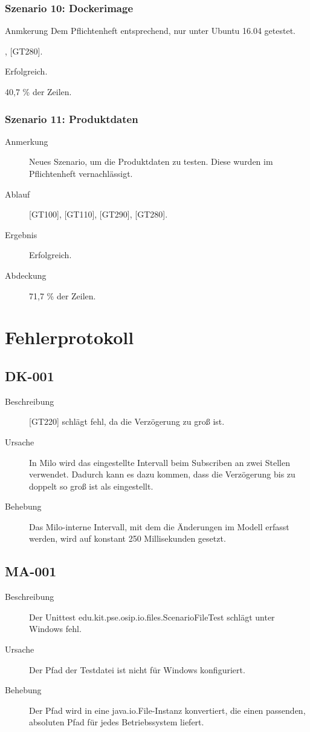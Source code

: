 \documentclass[parskip=full]{scrartcl}
\begin{document}
\subsubsection{Szenario 10: Dockerimage}
\begin{description}
	\item{Anmkerung} Dem Pflichtenheft entsprechend, nur unter Ubuntu 16.04 getestet.
	\item[Ablauf] [GT130], [GT280].
	\item[Ergebnis] Erfolgreich.
	\item[Abdeckung] 40,7 \% der Zeilen.
\end{description}

\subsubsection{Szenario 11: Produktdaten}
\begin{description}
	\item[Anmerkung] Neues Szenario, um die Produktdaten zu testen. Diese wurden im Pflichtenheft vernachlässigt.
	\item[Ablauf] [GT100], [GT110], [GT290], [GT280].
	\item[Ergebnis] Erfolgreich.
	\item[Abdeckung] 71,7 \% der Zeilen.
\end{description}

\section{Fehlerprotokoll}

\subsection{DK-001}
\begin{description}
	\item[Beschreibung] [GT220] schlägt fehl, da die Verzögerung zu groß ist.
	\item[Ursache] In Milo wird das eingestellte Intervall beim Subscriben an zwei Stellen verwendet. Dadurch kann es dazu kommen, dass die Verzögerung bis zu doppelt so groß ist als eingestellt.
	\item[Behebung] Das Milo-interne Intervall, mit dem die Änderungen im Modell erfasst werden, wird auf konstant 250 Millisekunden gesetzt.
\end{description}

\subsection{MA-001}
\begin{description}
	\item[Beschreibung] Der Unittest edu.kit.pse.osip.io.files.ScenarioFileTest schlägt unter Windows fehl.
	\item[Ursache] Der Pfad der Testdatei ist nicht für Windows konfiguriert.
	\item[Behebung] Der Pfad wird in eine java.io.File-Instanz konvertiert, die einen passenden, absoluten Pfad für jedes Betriebssystem liefert.
\end{description}
\end{document}
